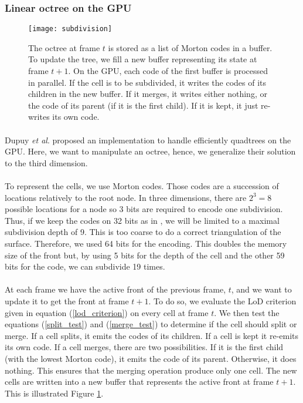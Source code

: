 \subsubsection*{Linear octree on the GPU}

\begin{figure}
\centering
\texttt{[image: subdivision]}
\caption{The octree at frame $t$ is stored as a list of Morton codes in a buffer. 
To update the tree, we fill a new buffer representing its state at frame $t+1$. 
On the GPU, each code of the first buffer is processed in parallel. 
If the cell is to be subdivided, it writes the codes of its children in the new buffer. 
If it merges, it writes either nothing, or the code of its parent (if it is the first child).
If it is kept, it just re-writes its own code. }
\label{subdivision}
\end{figure}

\paragraph{}
Dupuy \textit{et al}. \cite{dupuy2014quadtrees} proposed an implementation to handle efficiently quadtrees on the GPU.
Here, we want to manipulate an octree, hence, we generalize their solution to the third dimension.

\paragraph{}
To represent the cells, we use Morton codes.
Those codes are a succession of locations relatively to the root node.
In three dimensions, there are $2^3 = 8$ possible locations for a node so 3 bits are required to encode one subdivision.
Thus, if we keep the codes on 32 bits as in \cite{dupuy2014quadtrees}, we will be limited to a maximal subdivision depth of 9.
This is too coarse to do a correct triangulation of the surface.
Therefore, we used 64 bits for the encoding. 
This doubles the memory size of the front but, by using 5 bits for the depth of the cell and the other 59 bits for the code, we can subdivide 19 times.

\paragraph{}
At each frame we have the active front of the previous frame, $t$, and we want to update it to get the front at frame $t+1$.
To do so, we evaluate the LoD criterion given in equation (\ref{lod_criterion}) on every cell at frame $t$.
We then test the equations (\ref{split_test}) and (\ref{merge_test}) to determine if the cell should split or merge.
If a cell splits, it emits the codes of its children.
If a cell is kept it re-emits its own code.
If a cell merges, there are two possibilities.
If it is the first child (with the lowest Morton code), it emits the code of its parent.
Otherwise, it does nothing. 
This ensures that the merging operation produce only one cell.
The new cells are written into a new buffer that represents the active front at frame $t+1$.
This is illustrated Figure \ref{subdivision}.

